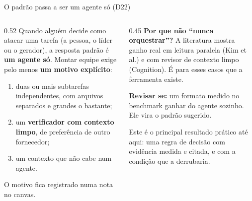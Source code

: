 \documentclass[11pt,aspectratio=169]{beamer}
\begin{document}
\begin{frame}{O padrão passa a ser um agente só (D22)}
\begin{columns}[T]
\begin{column}{0.52\linewidth}
\small
Quando alguém decide como atacar uma tarefa (a pessoa, o líder ou o gerador), a resposta padrão é
\textbf{um agente só}. Montar equipe exige pelo menos \textbf{um motivo explícito}:
\begin{enumerate}\setlength\itemsep{0.3em}
\item duas ou mais subtarefas independentes, com arquivos separados e grandes o bastante;
\item um \textbf{verificador com contexto limpo}, de preferência de outro fornecedor;
\item um contexto que não cabe num agente.
\end{enumerate}
O motivo fica registrado numa nota no canvas.
\end{column}
\begin{column}{0.45\linewidth}
\small
\textbf{Por que não ``nunca orquestrar''?} A literatura mostra ganho real em leitura paralela (Kim et al.) e
com revisor de contexto limpo (Cognition). É para esses casos que a ferramenta existe.
\vspace{0.5em}

\textbf{Revisar se:} um formato medido no benchmark ganhar do agente sozinho. Ele vira o padrão sugerido.
\vspace{0.5em}

{\scriptsize\color{suave} Este é o principal resultado prático até aqui: uma regra de decisão com evidência
medida e citada, e com a condição que a derrubaria.}
\end{column}
\end{columns}
\end{frame}
\end{document}
